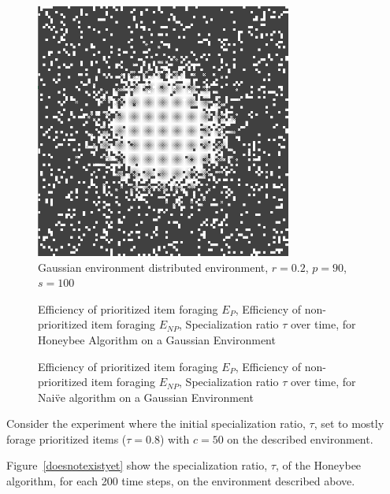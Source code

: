 \begin{figure}[!htb]
\centering
\includegraphics[width=0.75\textwidth]{chapters/chapter6/figures/flexibility-gaussian-obj90-ratio.PNG}
\caption{Gaussian environment distributed environment, $r=0.2$, $p=90$, $s=100$}
\label{fig:gaussianhighdensityenv}
\end{figure}

\begin{figure}[!htb]
\centering
\small
\resizebox{\textwidth}{!}{}
\caption{Efficiency of prioritized item foraging $E_P$, Efficiency of non-prioritized item foraging $E_{NP}$, Specialization ratio $\tau$ over time, for Honeybee Algorithm on a Gaussian Environment}
\label{fig:gaussianhighdensityperformance}
\end{figure}

\begin{figure}[!htb]
\centering
\small
\resizebox{\textwidth}{!}{}
\caption{Efficiency of prioritized item foraging $E_P$, Efficiency of non-prioritized item foraging $E_{NP}$, Specialization ratio $\tau$ over time, for Nai\"ve algorithm on a Gaussian Environment}
\label{fig:gaussianhighdensityperformance}
\end{figure}


Consider the experiment where the initial specialization ratio, $\tau$, set to mostly forage prioritized items ($\tau=0.8$) with $c=50$ on the described environment. 

Figure~\ref{doesnotexistyet} show the specialization ratio, $\tau$,  of the Honeybee algorithm, for each 200 time steps, on the environment described above. 


